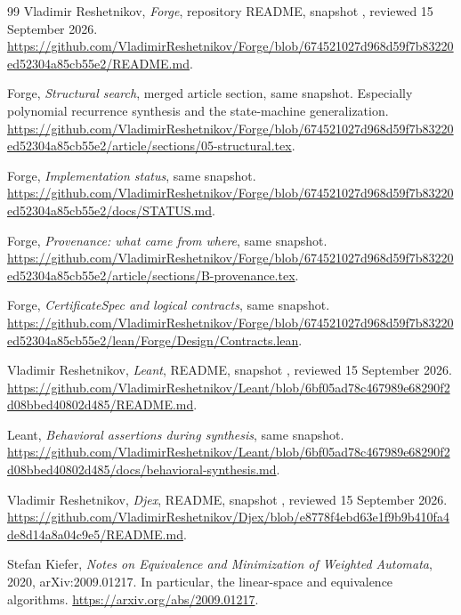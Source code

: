 {}
\begin{thebibliography}{99}
\small
{}
Vladimir Reshetnikov, \emph{Forge}, repository README, snapshot
, reviewed 15 September 2026.
\url{https://github.com/VladimirReshetnikov/Forge/blob/674521027d968d59f7b83220ed52304a85cb55e2/README.md}.

Forge, \emph{Structural search}, merged article section, same snapshot.
Especially polynomial recurrence synthesis and the state-machine generalization.
\url{https://github.com/VladimirReshetnikov/Forge/blob/674521027d968d59f7b83220ed52304a85cb55e2/article/sections/05-structural.tex}.

Forge, \emph{Implementation status}, same snapshot.
\url{https://github.com/VladimirReshetnikov/Forge/blob/674521027d968d59f7b83220ed52304a85cb55e2/docs/STATUS.md}.

Forge, \emph{Provenance: what came from where}, same snapshot.
\url{https://github.com/VladimirReshetnikov/Forge/blob/674521027d968d59f7b83220ed52304a85cb55e2/article/sections/B-provenance.tex}.

Forge, \emph{CertificateSpec and logical contracts}, same snapshot.
\url{https://github.com/VladimirReshetnikov/Forge/blob/674521027d968d59f7b83220ed52304a85cb55e2/lean/Forge/Design/Contracts.lean}.

Vladimir Reshetnikov, \emph{Leant}, README, snapshot
, reviewed 15 September 2026.
\url{https://github.com/VladimirReshetnikov/Leant/blob/6bf05ad78c467989e68290f2d08bbed40802d485/README.md}.

Leant, \emph{Behavioral assertions during synthesis}, same snapshot.
\url{https://github.com/VladimirReshetnikov/Leant/blob/6bf05ad78c467989e68290f2d08bbed40802d485/docs/behavioral-synthesis.md}.

Vladimir Reshetnikov, \emph{Djex}, README, snapshot
, reviewed 15 September 2026.
\url{https://github.com/VladimirReshetnikov/Djex/blob/e8778f4ebd63e1f9b9b410fa4de8d14a8a04c9e5/README.md}.

Stefan Kiefer, \emph{Notes on Equivalence and Minimization of Weighted Automata},
2020, arXiv:2009.01217. In particular, the linear-space and equivalence algorithms.
\url{https://arxiv.org/abs/2009.01217}.


\end{thebibliography}
